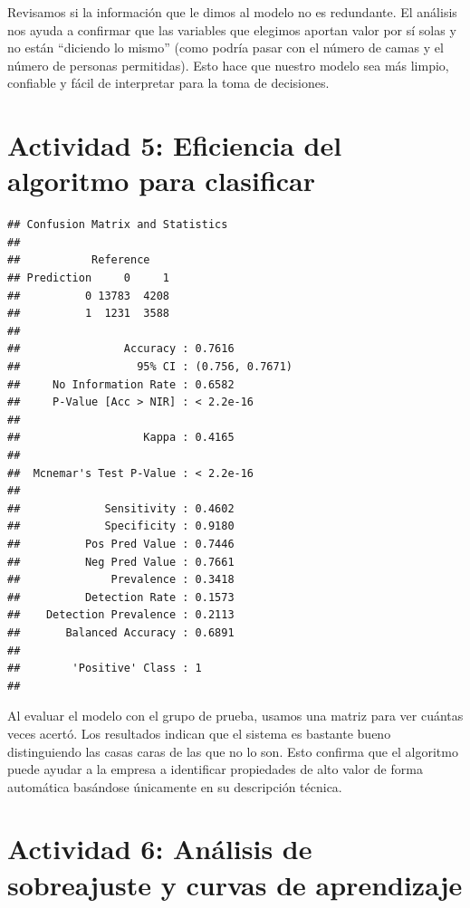 \documentclass[
]{article}
\begin{document}
Revisamos si la información que le dimos al modelo no es redundante. El
análisis nos ayuda a confirmar que las variables que elegimos aportan
valor por sí solas y no están ``diciendo lo mismo'' (como podría pasar
con el número de camas y el número de personas permitidas). Esto hace
que nuestro modelo sea más limpio, confiable y fácil de interpretar para
la toma de decisiones.

\section{Actividad 5: Eficiencia del algoritmo para
clasificar}\label{actividad-5-eficiencia-del-algoritmo-para-clasificar}

\begin{verbatim}
## Confusion Matrix and Statistics
## 
##           Reference
## Prediction     0     1
##          0 13783  4208
##          1  1231  3588
##                                          
##                Accuracy : 0.7616         
##                  95% CI : (0.756, 0.7671)
##     No Information Rate : 0.6582         
##     P-Value [Acc > NIR] : < 2.2e-16      
##                                          
##                   Kappa : 0.4165         
##                                          
##  Mcnemar's Test P-Value : < 2.2e-16      
##                                          
##             Sensitivity : 0.4602         
##             Specificity : 0.9180         
##          Pos Pred Value : 0.7446         
##          Neg Pred Value : 0.7661         
##              Prevalence : 0.3418         
##          Detection Rate : 0.1573         
##    Detection Prevalence : 0.2113         
##       Balanced Accuracy : 0.6891         
##                                          
##        'Positive' Class : 1              
## 
\end{verbatim}

Al evaluar el modelo con el grupo de prueba, usamos una matriz para ver
cuántas veces acertó. Los resultados indican que el sistema es bastante
bueno distinguiendo las casas caras de las que no lo son. Esto confirma
que el algoritmo puede ayudar a la empresa a identificar propiedades de
alto valor de forma automática basándose únicamente en su descripción
técnica.

\section{Actividad 6: Análisis de sobreajuste y curvas de
aprendizaje}\label{actividad-6-anuxe1lisis-de-sobreajuste-y-curvas-de-aprendizaje}
\end{document}
